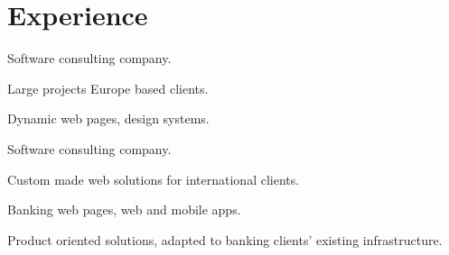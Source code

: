 \documentclass[]{plushcv}
\begin{document}
\begin{minipage}[t]{0.70\textwidth} 



\section{Experience}

\vspace{\topsep} %
\begin{tightemize}
\sectionsep
\item Software consulting company.
\item Large projects Europe based clients.
\item Dynamic web pages, design systems.  
\end{tightemize}
\sectionsep

\begin{tightemize}
\sectionsep
\item Software consulting company.
\item Custom made web solutions for international clients.
\end{tightemize}
\sectionsep

\begin{tightemize}
\sectionsep
\item Banking web pages, web and mobile apps.
\item Product oriented solutions, adapted to banking clients' existing infrastructure. 
\end{tightemize}
\sectionsep





\end{minipage}
\end{document}
